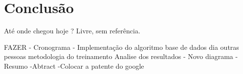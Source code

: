 \chapter{Conclusão}

Até onde chegou hoje ? Livre, sem referência.

FAZER
- Cronograma - 
	Implementação do algoritmo
	base de dados
		dia
		outras pessoas
	metodologia do treinamento
	Analise dos resultados
- Novo diagrama
- Resumo
-Abtract
-Colocar a patente do google